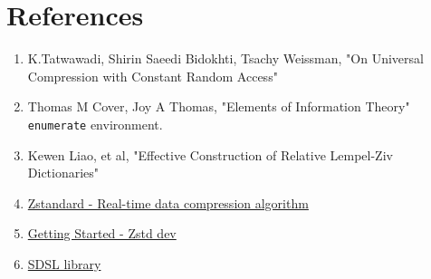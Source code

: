 \section{References}
\begin{enumerate}
  \item K.Tatwawadi, Shirin Saeedi Bidokhti, Tsachy Weissman, "On Universal Compression with Constant Random Access"
  \item Thomas M Cover, Joy A Thomas, "Elements of Information Theory" \texttt{enumerate} environment.
  \item Kewen Liao, et al, "Effective Construction of Relative Lempel-Ziv Dictionaries"
  \item \href{http://facebook.github.io/zstd/}{Zstandard - Real-time data compression algorithm} 
  \item \href{https://zstd.docsforge.com/dev/}{Getting Started - Zstd dev} 
  \item \href{https://github.com/simongog/sdsl-lite}{SDSL library}
\end{enumerate}